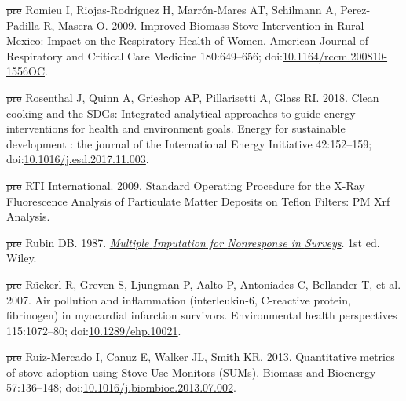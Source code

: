 \documentclass[
  letterpaper,
  DIV=11,
  numbers=noendperiod]{scrartcl}
\newlength{\cslhangindent}
\newenvironment{CSLReferences}[2] %
 {\begin{list}{}{%
  \setlength{\itemindent}{0pt} %
  \setlength{\leftmargin}{0pt} %
  \setlength{\parsep}{0pt} %
  \ifodd #1
   \setlength{\leftmargin}{\cslhangindent} %
   \setlength{\itemindent}{-1\cslhangindent} %
  \fi
  \setlength{\itemsep}{#2\baselineskip}}} %
 {\end{list}} %
\providecommand{\DIFdeltex}[1]{{\protect\color{red}\sout{#1}}}                      %
\providecommand{\DIFaddbegin}{} %
\providecommand{\DIFaddend}{} %
\providecommand{\DIFdelbegin}{} %
\providecommand{\DIFdelend}{} %
\providecommand{\DIFdel}[1]{\texorpdfstring{\DIFdeltex{#1}}{}} %
\newcommand{\DIFscaledelfig}{0.5}
\newlength{\DIFdelgraphicswidth} %
\newlength{\DIFdelgraphicsheight} %
\newcommand{\DIFaddincludegraphics}[2][]{{\color{blue}\fbox{\DIFOincludegraphics[#1]{#2}}}} %
\newcommand{\DIFdelincludegraphics}[2][]{%
\sbox{\DIFdelgraphicsbox}{\DIFOincludegraphics[#1]{#2}}%
\settoboxwidth{\DIFdelgraphicswidth}{\DIFdelgraphicsbox} %
\settoboxtotalheight{\DIFdelgraphicsheight}{\DIFdelgraphicsbox} %
\scalebox{\DIFscaledelfig}{%
\parbox[b]{\DIFdelgraphicswidth}{\usebox{\DIFdelgraphicsbox}\\[-\baselineskip] \rule{\DIFdelgraphicswidth}{0em}}\llap{\resizebox{\DIFdelgraphicswidth}{\DIFdelgraphicsheight}{%
\setlength{\unitlength}{\DIFdelgraphicswidth}%
\begin{picture}(1,1)%
\thicklines\linethickness{2pt} %
{\color[rgb]{1,0,0}\put(0,0){\framebox(1,1){}}}%
{\color[rgb]{1,0,0}\put(0,0){\line( 1,1){1}}}%
{\color[rgb]{1,0,0}\put(0,1){\line(1,-1){1}}}%
\end{picture}%
}\hspace*{3pt}}} %
} %
\DeclareRobustCommand{\DIFaddbegin}{\DIFOaddbegin \let\includegraphics\DIFaddincludegraphics} %
\DeclareRobustCommand{\DIFaddend}{\DIFOaddend \let\includegraphics\DIFOincludegraphics} %
\DeclareRobustCommand{\DIFdelbegin}{\DIFOdelbegin \let\includegraphics\DIFdelincludegraphics} %
\DeclareRobustCommand{\DIFdelend}{\DIFOaddend \let\includegraphics\DIFOincludegraphics} %
\begin{document}
\begin{CSLReferences}{1}{1}
\DIFdelbegin %
\DIFdel{pre}%
\DIFdelend \DIFaddbegin {}
\DIFaddend Romieu I, Riojas-Rodríguez H, Marrón-Mares AT, Schilmann A,
Perez-Padilla R, Masera O. 2009. Improved {Biomass Stove Intervention}
in {Rural Mexico}: {Impact} on the {Respiratory Health} of {Women}.
American Journal of Respiratory and Critical Care Medicine 180:649--656;
doi:\href{https://doi.org/10.1164/rccm.200810-1556OC}{10.1164/rccm.200810-1556OC}.

\DIFdelbegin %
\DIFdel{pre}%
\DIFdelend \DIFaddbegin {}
\DIFaddend Rosenthal J, Quinn A, Grieshop AP, Pillarisetti A, Glass RI. 2018. Clean
cooking and the {SDGs}: {Integrated} analytical approaches to guide
energy interventions for health and environment goals. Energy for
sustainable development : the journal of the International Energy
Initiative 42:152--159;
doi:\href{https://doi.org/10.1016/j.esd.2017.11.003}{10.1016/j.esd.2017.11.003}.

\DIFdelbegin %
\DIFdel{pre}%
\DIFdelend \DIFaddbegin {}
\DIFaddend RTI International. 2009. Standard {Operating Procedure} for the {X-Ray
Fluorescence Analysis} of {Particulate Matter Deposits} on {Teflon
Filters}: {PM Xrf Analysis}.

\DIFdelbegin %
\DIFdel{pre}%
\DIFdelend \DIFaddbegin {}
\DIFaddend Rubin DB. 1987.
\emph{\href{https://doi.org/10.1002/9780470316696}{Multiple {Imputation}
for {Nonresponse} in {Surveys}}}. 1st ed. Wiley.

\DIFdelbegin %
\DIFdel{pre}%
\DIFdelend \DIFaddbegin {}
\DIFaddend Rückerl R, Greven S, Ljungman P, Aalto P, Antoniades C, Bellander T, et
al. 2007. Air pollution and inflammation (interleukin-6, {C-reactive}
protein, fibrinogen) in myocardial infarction survivors. Environmental
health perspectives 115:1072--80;
doi:\href{https://doi.org/10.1289/ehp.10021}{10.1289/ehp.10021}.

\DIFdelbegin %
\DIFdel{pre}%
\DIFdelend \DIFaddbegin {}
\DIFaddend Ruiz-Mercado I, Canuz E, Walker JL, Smith KR. 2013. Quantitative metrics
of stove adoption using {Stove Use Monitors} ({SUMs}). Biomass and
Bioenergy 57:136--148;
doi:\href{https://doi.org/10.1016/j.biombioe.2013.07.002}{10.1016/j.biombioe.2013.07.002}.


\end{CSLReferences}
\end{document}
